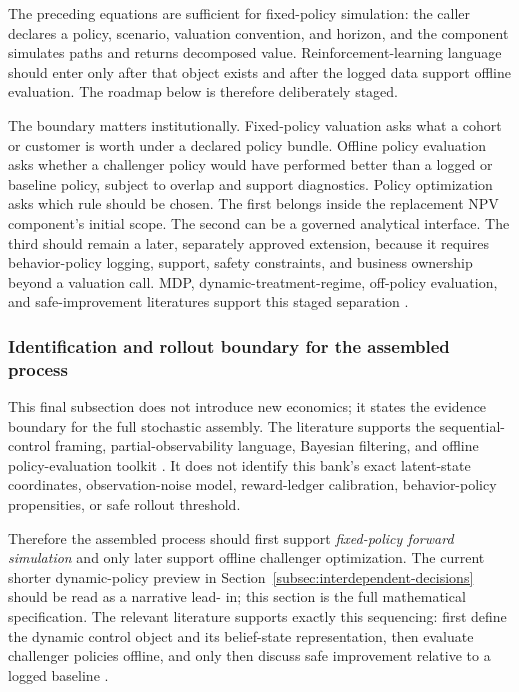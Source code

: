 \documentclass[11pt]{article}
\newcommand{\1}{\mathbf{1}}
\begin{document}
The preceding equations are sufficient for fixed-policy simulation: the caller
declares a policy, scenario, valuation convention, and horizon, and the
component simulates paths and returns decomposed value. Reinforcement-learning
language should enter only after that object exists and after the logged data
support offline evaluation. The roadmap below is therefore deliberately staged.

The boundary matters institutionally. Fixed-policy valuation asks what a cohort
or customer is worth under a declared policy bundle. Offline policy evaluation
asks whether a challenger policy would have performed better than a logged or
baseline policy, subject to overlap and support diagnostics. Policy optimization
asks which rule should be chosen. The first belongs inside the replacement NPV
component's initial scope. The second can be a governed analytical interface.
The third should remain a later, separately approved extension, because it
requires behavior-policy logging, support, safety constraints, and business
ownership beyond a valuation call. MDP, dynamic-treatment-regime, off-policy
evaluation, and safe-improvement literatures support this staged separation
\citep{puterman1994mdp,murphy2003dynamic,jiangli2016dr,
huwager2021pomdpope,laroche2019spibb,khraishiokhrati2022offlinecredit}.

\subsubsection{Identification and rollout boundary for the assembled process}
\label{subsec:state-space-identification-boundary}

This final subsection does not introduce new economics; it states the evidence
boundary for the full stochastic assembly. The literature supports the
sequential-control framing, partial-observability language, Bayesian filtering,
and offline policy-evaluation toolkit
\citep{puterman1994mdp,murphy2003dynamic,smallwood1973pomdp,kaelbling1998pomdp,
trench2003bankone,durbinkoopman2012ssm,westharrison1997bfdm,doucet2001smc,
jiangli2016dr,huwager2021pomdpope,laroche2019spibb,
khraishiokhrati2022offlinecredit,chehrazi2015dynamicvaluation,
chehrazi2019collections}. It does not identify this bank's exact latent-state
coordinates, observation-noise model, reward-ledger calibration,
behavior-policy propensities, or safe rollout threshold.

Therefore the assembled process should first support
\emph{fixed-policy forward simulation} and only later support offline challenger
optimization. The current shorter dynamic-policy preview in
Section~\ref{subsec:interdependent-decisions} should be read as a narrative lead-
in; this section is the full mathematical specification. The relevant literature
supports exactly this sequencing: first define the dynamic control object and
its belief-state representation, then evaluate challenger policies offline, and
only then discuss safe improvement relative to a logged baseline
\citep{puterman1994mdp,murphy2003dynamic,jiangli2016dr,
huwager2021pomdpope,laroche2019spibb,khraishiokhrati2022offlinecredit}.
\end{document}
